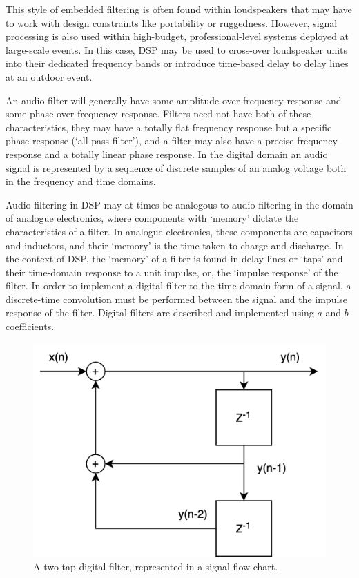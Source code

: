 \documentclass{report}
\begin{document}
        This style of embedded filtering is often found within loudspeakers that may have to work with design constraints like portability or ruggedness.
        However, signal processing is also used within high-budget, professional-level systems deployed at large-scale events.
        In this case, DSP may be used to cross-over loudspeaker units into their dedicated frequency bands or introduce time-based delay to delay lines at an outdoor event.

        An audio filter will generally have some amplitude-over-frequency response and some phase-over-frequency response.
        Filters need not have both of these characteristics, they may have a totally flat frequency response but a specific phase response (`all-pass filter'), and a filter may also have a precise frequency response and a totally linear phase response.
        In the digital domain an audio signal is represented by a sequence of discrete samples of an analog voltage both in the frequency and time domains.

        Audio filtering in DSP may at times be analogous to audio filtering in the domain of analogue electronics, where components with `memory' dictate the characteristics of a filter. 
        In analogue electronics, these components are capacitors and inductors, and their `memory' is the time taken to charge and discharge.
        In the context of DSP, the `memory' of a filter is found in delay lines or `taps' and their time-domain response to a unit impulse, or, the `impulse response' of the filter.
        In order to implement a digital filter to the time-domain form of a signal, a discrete-time convolution must be performed between the signal and the impulse response of the filter.
        Digital filters are described and implemented using $a$ and $b$ coefficients.

        \begin{figure}[H]
            \centering
            \includegraphics[width = 0.4\linewidth]{figs/filterGraph.png}
            \caption{A two-tap digital filter, represented in a signal flow chart.}
            \label{filterGraph}
        \end{figure}
        
\end{document}
